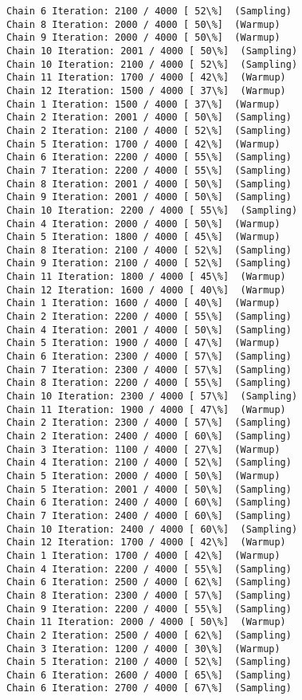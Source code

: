 \documentclass[11pt]{article}
\begin{document}
\begin{Verbatim}[commandchars=\\\{\}]
Chain 6 Iteration: 2100 / 4000 [ 52\%]  (Sampling)
Chain 8 Iteration: 2000 / 4000 [ 50\%]  (Warmup)
Chain 9 Iteration: 2000 / 4000 [ 50\%]  (Warmup)
Chain 10 Iteration: 2001 / 4000 [ 50\%]  (Sampling)
Chain 10 Iteration: 2100 / 4000 [ 52\%]  (Sampling)
Chain 11 Iteration: 1700 / 4000 [ 42\%]  (Warmup)
Chain 12 Iteration: 1500 / 4000 [ 37\%]  (Warmup)
Chain 1 Iteration: 1500 / 4000 [ 37\%]  (Warmup)
Chain 2 Iteration: 2001 / 4000 [ 50\%]  (Sampling)
Chain 2 Iteration: 2100 / 4000 [ 52\%]  (Sampling)
Chain 5 Iteration: 1700 / 4000 [ 42\%]  (Warmup)
Chain 6 Iteration: 2200 / 4000 [ 55\%]  (Sampling)
Chain 7 Iteration: 2200 / 4000 [ 55\%]  (Sampling)
Chain 8 Iteration: 2001 / 4000 [ 50\%]  (Sampling)
Chain 9 Iteration: 2001 / 4000 [ 50\%]  (Sampling)
Chain 10 Iteration: 2200 / 4000 [ 55\%]  (Sampling)
Chain 4 Iteration: 2000 / 4000 [ 50\%]  (Warmup)
Chain 5 Iteration: 1800 / 4000 [ 45\%]  (Warmup)
Chain 8 Iteration: 2100 / 4000 [ 52\%]  (Sampling)
Chain 9 Iteration: 2100 / 4000 [ 52\%]  (Sampling)
Chain 11 Iteration: 1800 / 4000 [ 45\%]  (Warmup)
Chain 12 Iteration: 1600 / 4000 [ 40\%]  (Warmup)
Chain 1 Iteration: 1600 / 4000 [ 40\%]  (Warmup)
Chain 2 Iteration: 2200 / 4000 [ 55\%]  (Sampling)
Chain 4 Iteration: 2001 / 4000 [ 50\%]  (Sampling)
Chain 5 Iteration: 1900 / 4000 [ 47\%]  (Warmup)
Chain 6 Iteration: 2300 / 4000 [ 57\%]  (Sampling)
Chain 7 Iteration: 2300 / 4000 [ 57\%]  (Sampling)
Chain 8 Iteration: 2200 / 4000 [ 55\%]  (Sampling)
Chain 10 Iteration: 2300 / 4000 [ 57\%]  (Sampling)
Chain 11 Iteration: 1900 / 4000 [ 47\%]  (Warmup)
Chain 2 Iteration: 2300 / 4000 [ 57\%]  (Sampling)
Chain 2 Iteration: 2400 / 4000 [ 60\%]  (Sampling)
Chain 3 Iteration: 1100 / 4000 [ 27\%]  (Warmup)
Chain 4 Iteration: 2100 / 4000 [ 52\%]  (Sampling)
Chain 5 Iteration: 2000 / 4000 [ 50\%]  (Warmup)
Chain 5 Iteration: 2001 / 4000 [ 50\%]  (Sampling)
Chain 6 Iteration: 2400 / 4000 [ 60\%]  (Sampling)
Chain 7 Iteration: 2400 / 4000 [ 60\%]  (Sampling)
Chain 10 Iteration: 2400 / 4000 [ 60\%]  (Sampling)
Chain 12 Iteration: 1700 / 4000 [ 42\%]  (Warmup)
Chain 1 Iteration: 1700 / 4000 [ 42\%]  (Warmup)
Chain 4 Iteration: 2200 / 4000 [ 55\%]  (Sampling)
Chain 6 Iteration: 2500 / 4000 [ 62\%]  (Sampling)
Chain 8 Iteration: 2300 / 4000 [ 57\%]  (Sampling)
Chain 9 Iteration: 2200 / 4000 [ 55\%]  (Sampling)
Chain 11 Iteration: 2000 / 4000 [ 50\%]  (Warmup)
Chain 2 Iteration: 2500 / 4000 [ 62\%]  (Sampling)
Chain 3 Iteration: 1200 / 4000 [ 30\%]  (Warmup)
Chain 5 Iteration: 2100 / 4000 [ 52\%]  (Sampling)
Chain 6 Iteration: 2600 / 4000 [ 65\%]  (Sampling)
Chain 6 Iteration: 2700 / 4000 [ 67\%]  (Sampling)

\end{Verbatim}
\end{document}
